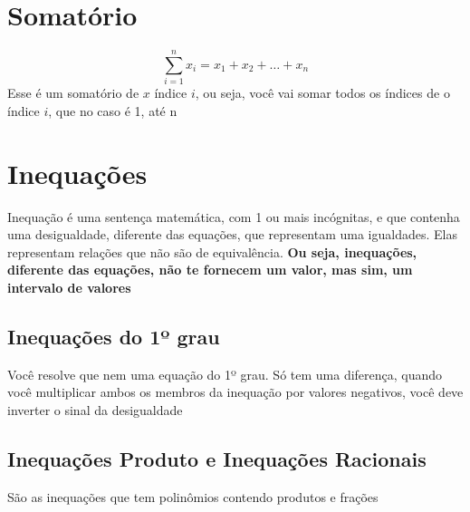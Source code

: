 \documentclass{article}
\begin{document}
\section{Somatório}
\[
\sum_{i=1}^{n} x_i = x_1 + x_2 + \dots + x_n
\]
Esse é um somatório de $x$ índice $i$, ou seja, você vai somar todos os índices de o índice $i$, que no caso é 1, até n

\section{Inequações}
Inequação é uma sentença matemática, com 1 ou mais incógnitas, e que contenha uma desigualdade, diferente das equações, que representam uma igualdades. Elas representam relações que não são de equivalência. \textbf{Ou seja, inequações, diferente das equações, não te fornecem um valor, mas sim, um intervalo de valores}

\subsection{Inequações do 1º grau}
Você resolve que nem uma equação do 1º grau. Só tem uma diferença, quando você multiplicar ambos os membros da inequação por valores negativos, você deve inverter o sinal da desigualdade

\subsection{Inequações Produto e Inequações Racionais}
São as inequações que tem polinômios contendo produtos e frações
\end{document}
